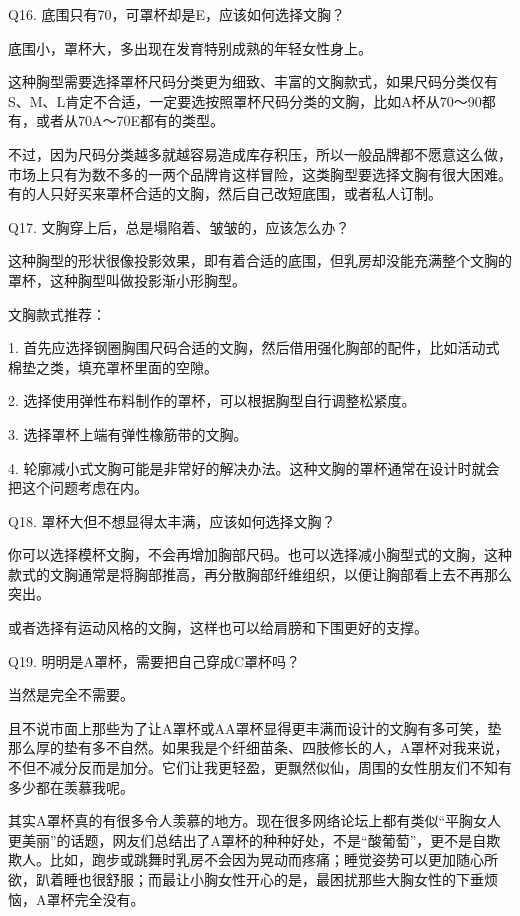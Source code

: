 \documentclass[12pt,UTF8]{ctexbook}
\begin{document}
Q16. 底围只有70，可罩杯却是E，应该如何选择文胸？


底围小，罩杯大，多出现在发育特别成熟的年轻女性身上。

这种胸型需要选择罩杯尺码分类更为细致、丰富的文胸款式，如果尺码分类仅有S、M、L肯定不合适，一定要选按照罩杯尺码分类的文胸，比如A杯从70～90都有，或者从70A～70E都有的类型。

不过，因为尺码分类越多就越容易造成库存积压，所以一般品牌都不愿意这么做，市场上只有为数不多的一两个品牌肯这样冒险，这类胸型要选择文胸有很大困难。有的人只好买来罩杯合适的文胸，然后自己改短底围，或者私人订制。





Q17. 文胸穿上后，总是塌陷着、皱皱的，应该怎么办？


这种胸型的形状很像投影效果，即有着合适的底围，但乳房却没能充满整个文胸的罩杯，这种胸型叫做投影渐小形胸型。


文胸款式推荐：

1. 首先应选择钢圈胸围尺码合适的文胸，然后借用强化胸部的配件，比如活动式棉垫之类，填充罩杯里面的空隙。

2. 选择使用弹性布料制作的罩杯，可以根据胸型自行调整松紧度。

3. 选择罩杯上端有弹性橡筋带的文胸。

4. 轮廓减小式文胸可能是非常好的解决办法。这种文胸的罩杯通常在设计时就会把这个问题考虑在内。





Q18. 罩杯大但不想显得太丰满，应该如何选择文胸？


你可以选择模杯文胸，不会再增加胸部尺码。也可以选择减小胸型式的文胸，这种款式的文胸通常是将胸部推高，再分散胸部纤维组织，以便让胸部看上去不再那么突出。

或者选择有运动风格的文胸，这样也可以给肩膀和下围更好的支撑。





Q19. 明明是A罩杯，需要把自己穿成C罩杯吗？


当然是完全不需要。

且不说市面上那些为了让A罩杯或AA罩杯显得更丰满而设计的文胸有多可笑，垫那么厚的垫有多不自然。如果我是个纤细苗条、四肢修长的人，A罩杯对我来说，不但不减分反而是加分。它们让我更轻盈，更飘然似仙，周围的女性朋友们不知有多少都在羡慕我呢。

其实A罩杯真的有很多令人羡慕的地方。现在很多网络论坛上都有类似“平胸女人更美丽”的话题，网友们总结出了A罩杯的种种好处，不是“酸葡萄”，更不是自欺欺人。比如，跑步或跳舞时乳房不会因为晃动而疼痛；睡觉姿势可以更加随心所欲，趴着睡也很舒服；而最让小胸女性开心的是，最困扰那些大胸女性的下垂烦恼，A罩杯完全没有。
\end{document}
